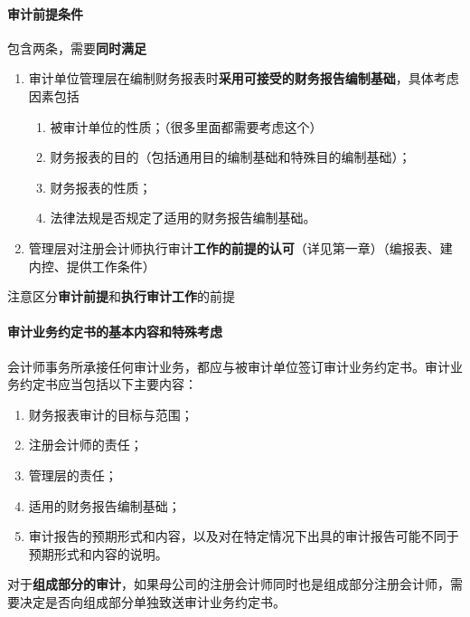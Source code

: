 \documentclass[UTF8,12pt]{ctexart}
\numberwithin{equation}{section} %
\numberwithin{figure}{section}
\numberwithin{table}{section}
\begin{document}
	\paragraph{审计前提条件}
	包含两条，需要\textbf{同时满足}
	\begin{enumerate}
		\item 审计单位管理层在编制财务报表时\textbf{采用可接受的财务报告编制基础}，具体考虑因素包括
		\begin{enumerate}
			\item 被审计单位的性质；（很多里面都需要考虑这个）
			
			\item 财务报表的目的（包括通用目的编制基础和特殊目的编制基础）；
			
			\item 财务报表的性质；
			
			\item 法律法规是否规定了适用的财务报告编制基础。
		\end{enumerate}
		
		\item 管理层对注册会计师执行审计\textbf{工作的前提的认可}（详见第一章）（编报表、建内控、提供工作条件）
	\end{enumerate}
	
	注意区分\textbf{审计前提}和\textbf{执行审计工作}的前提
	
	\paragraph{审计业务约定书的基本内容和特殊考虑}

	会计师事务所承接任何审计业务，都应与被审计单位签订审计业务约定书。审计业务约定书应当包括以下主要内容：
	\begin{enumerate}
		\item 财务报表审计的目标与范围；
		
		\item 注册会计师的责任；
		
		\item 管理层的责任；
		
		\item 适用的财务报告编制基础；
		
		\item 审计报告的预期形式和内容，以及对在特定情况下出具的审计报告可能不同于预期形式和内容的说明。
	\end{enumerate}
	
	对于\textbf{组成部分的审计}，如果母公司的注册会计师同时也是组成部分注册会计师，需要决定是否向组成部分单独致送审计业务约定书。
	
\end{document}
